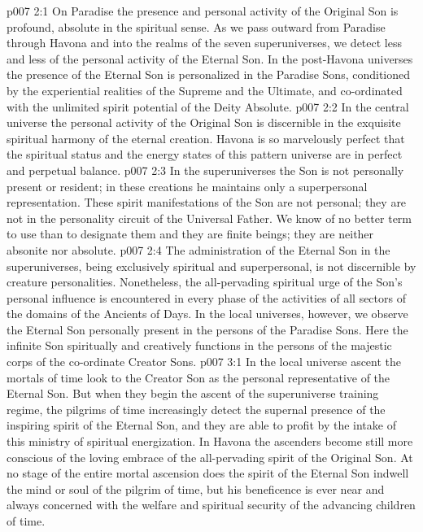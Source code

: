 \vs p007 2:1 On Paradise the presence and personal activity of the Original Son is profound, absolute in the spiritual sense. As we pass outward from Paradise through Havona and into the realms of the seven superuniverses, we detect less and less of the personal activity of the Eternal Son. In the post\hyp{}Havona universes the presence of the Eternal Son is personalized in the Paradise Sons, conditioned by the experiential realities of the Supreme and the Ultimate, and co\hyp{}ordinated with the unlimited spirit potential of the Deity Absolute.
\vs p007 2:2 In the central universe the personal activity of the Original Son is discernible in the exquisite spiritual harmony of the eternal creation. Havona is so marvelously perfect that the spiritual status and the energy states of this pattern universe are in perfect and perpetual balance.
\vs p007 2:3 In the superuniverses the Son is not personally present or resident; in these creations he maintains only a superpersonal representation. These spirit manifestations of the Son are not personal; they are not in the personality circuit of the Universal Father. We know of no better term to use than to designate them  and they are finite beings; they are neither absonite nor absolute.
\vs p007 2:4 The administration of the Eternal Son in the superuniverses, being exclusively spiritual and superpersonal, is not discernible by creature personalities. Nonetheless, the all\hyp{}pervading spiritual urge of the Son’s personal influence is encountered in every phase of the activities of all sectors of the domains of the Ancients of Days. In the local universes, however, we observe the Eternal Son personally present in the persons of the Paradise Sons. Here the infinite Son spiritually and creatively functions in the persons of the majestic corps of the co\hyp{}ordinate Creator Sons.
\vs p007 3:1 In the local universe ascent the mortals of time look to the Creator Son as the personal representative of the Eternal Son. But when they begin the ascent of the superuniverse training regime, the pilgrims of time increasingly detect the supernal presence of the inspiring spirit of the Eternal Son, and they are able to profit by the intake of this ministry of spiritual energization. In Havona the ascenders become still more conscious of the loving embrace of the all\hyp{}pervading spirit of the Original Son. At no stage of the entire mortal ascension does the spirit of the Eternal Son indwell the mind or soul of the pilgrim of time, but his beneficence is ever near and always concerned with the welfare and spiritual security of the advancing children of time.
